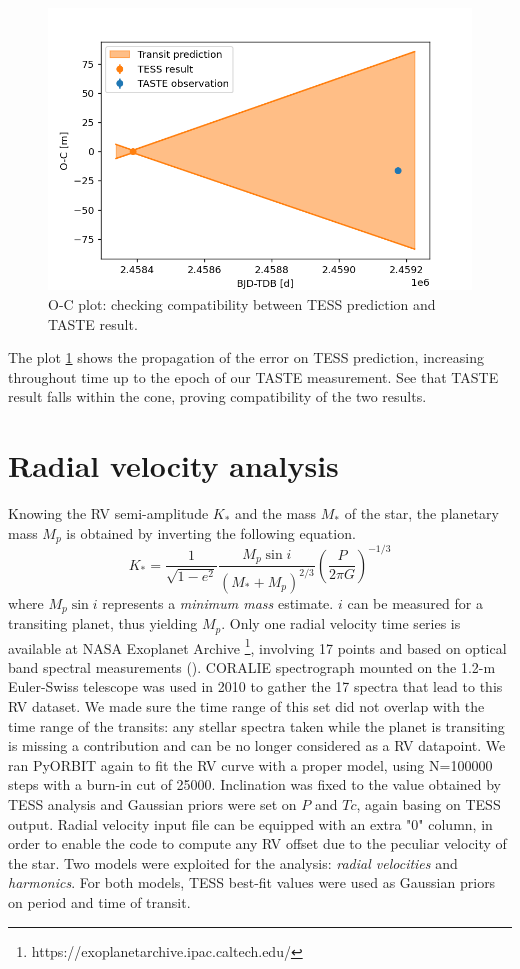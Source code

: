 \documentclass[a4paper,11pt,twocolumn]{article}
\begin{document}
\begin{figure}[H]
  \centering
    \includegraphics[scale=0.3, angle=0]{../pictures/comparison/oc.png}
    \caption{O-C plot: checking compatibility between TESS prediction and TASTE result.}
    \label{fig:ocplot}
\end{figure}
The plot \ref{fig:ocplot} shows the propagation of the error on TESS prediction,
increasing throughout time up to the epoch of our TASTE measurement. See 
that TASTE result falls within the cone, proving compatibility of the 
two results.

\newpage

\section{Radial velocity analysis}
Knowing the RV semi-amplitude $K_*$ and the mass $M_*$ of the star,
the planetary mass $M_p$ is obtained by inverting the following equation. 
\begin{equation}
    K_* = \frac{1}{\sqrt{1-e^2}}\frac{M_p \sin{i}}{(M_*+M_p)^{2/3}}\left(\frac{P}{2\pi G}\right)^{-1/3}
\end{equation}
where $M_p\sin{i}$ represents a \textit{minimum mass} estimate. $i$ can be 
measured for a transiting planet, thus yielding $M_p$. 
Only one radial velocity time series
is available at NASA Exoplanet Archive \footnote{https://exoplanetarchive.ipac.caltech.edu/}, 
involving 17 points and based on optical band spectral measurements 
(\cite{Anderson}). CORALIE spectrograph mounted on the 1.2-m
Euler-Swiss telescope was used in 2010 to gather the 17 spectra that lead
to this RV dataset. We made sure the time range of this set did not overlap 
with the time range of the transits: any stellar spectra taken while the planet is 
transiting is missing a contribution and can be no longer considered as a RV 
datapoint.
We ran PyORBIT again to fit the RV curve with a proper model, using N=100000 steps 
with a burn-in cut of 25000. Inclination was fixed to the value obtained by TESS 
analysis and Gaussian priors were set on $P$ and $Tc$, again basing on TESS output.
Radial velocity input file can be equipped with an extra "0" column, in order 
to enable the code to compute any RV offset due to the peculiar velocity of the star.
Two models were exploited for the analysis: \textit{radial velocities} and 
\textit{harmonics}. For both models, TESS best-fit values were used as 
Gaussian priors on period and time of transit.
\end{document}
